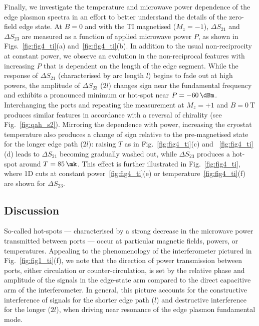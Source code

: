 Finally, we investigate the temperature and microwave power dependence of the edge plasmon spectra in an effort to better understand the details of the zero-field edge state.  At $B=0$ and with the TI magnetised ($M_z=-1$), $\Delta S_{21}$ and $\Delta S_{23}$ are measured as a function of applied microwave power $P$, as shown in Figs.~\ref{fig:fig4_ti}(a) and~\ref{fig:fig4_ti}(b). In addition to the usual non-reciprocity at constant power, we observe an evolution in the non-reciprocal features with increasing $P$ that is dependent on the length of the edge segment. While the response of $\Delta S_{21}$ (characterised by arc length $l$) begins to fade out at high powers, the amplitude of $\Delta S_{23}$ ($2l$) changes sign near the fundamental frequency and exhibits a pronounced minimum or hot-spot near $P = \SI{-60}{\dBm}$. Interchanging the ports and repeating the measurement at $M_z=+1$ and $B=\SI{0}{\tesla}$ produces similar features in accordance with a reversal of chirality (see Fig.~\ref{fig:qah_s2}). Mirroring the dependence with power, increasing the cryostat temperature also produces a change of sign relative to the pre-magnetised state for the longer edge path ($2l$): raising $T$ as in Fig.~\ref{fig:fig4_ti}(c) and ~\ref{fig:fig4_ti}(d) leads to $\Delta S_{21}$ becoming gradually washed out, while $\Delta S_{23}$ produces a hot-spot around $T = \SI{85}{\mk}$. This effect is further illustrated in Fig.~\ref{fig:fig4_ti}, where 1D cuts at constant power~\ref{fig:fig4_ti}(e) or temperature~\ref{fig:fig4_ti}(f) are shown for $\Delta S_{23}$.

\subsection{Discussion}
So-called hot-spots --- characterised by a strong decrease in the microwave power transmitted between ports --- occur at particular magnetic fields, powers, or temperatures. Appealing to the phenomenology of the interferometer pictured in Fig.~\ref{fig:fig1_ti}(f), we note that the direction of power transmission between ports, either circulation or counter-circulation, is set by the relative phase and amplitude of the signals in the edge-state arm compared to the direct capacitive arm of the interferometer. In general, this picture accounts for the constructive interference of signals for the shorter edge path ($l$) and destructive interference for the longer ($2l$), when driving near resonance of the edge plasmon fundamental mode.


